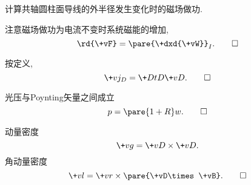 \documentclass{ctexart}
\begin{document}
\begin{sample}
    \begin{ex}[8.2]
        计算共轴圆柱面导线的外半径发生变化时的磁场做功.
    \end{ex}
    \begin{solution}
        注意磁场做功为电流不变时系统磁能的增加,
        \[ \rd{\+vF} = \pare{\+dxd{\+vW}}_I. \qedhere \]
    \end{solution}
\end{sample}
\begin{sample}
    \begin{solution}[10.1]
        按定义,
        \[ \+vj_D = \+DtD{\+vD}. \qedhere \]
    \end{solution}
\end{sample}
\begin{sample}
    \begin{solution}[10.9]
        光压与Poynting矢量之间成立
        \[ p = \pare{1+R} w. \qedhere \]
    \end{solution}
\end{sample}
\begin{sample}
    \begin{solution}[10.10]
        动量密度
        \[ \+vg = \+vD\times\+vD. \]
        角动量密度
        \[ \+vl = \+vr\times\pare{\+vD\times\+vB}.\qedhere \]
    \end{solution}
\end{sample}
\end{document}

